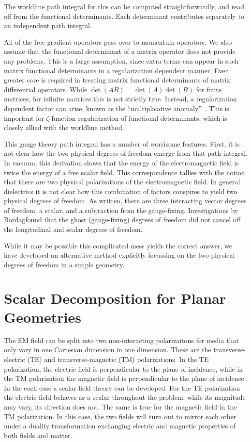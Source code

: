 The worldline path integral for this can be computed straightforwardly, and read off from the functional
determinants.  Each determinant contributes separately to an independent path integral.  

All of the free gradient operators pass over to momentum operators.  We also assume that the 
functional determinant of a matrix operator does not provide any problems.  This is a large assumption,
since extra terms can appear in such matrix functional determinants in a regularization dependent manner.
Even greater care is required in treating matrix functional determinants of matrix differential operators.
While $\det(AB)=\det(A)\det(B)$ for finite matrices, for infinite matrices this is not strictly true. 
Instead, a regularization dependent factor can arise, known as the ``multiplicative anomaly''~\cite{McKenzieSmith1998}.
This is important for $\zeta$-function regularization of functional determinants, which is closely allied with the worldline method.

This gauge theory path integral has a number of worrisome features.
First, it is not clear how the two physical degrees of freedom emerge from that path integral.
In vacuum, this derivation shows that the energy of the electromagnetic field is twice the energy 
of a free scalar field.  This correspondence tallies with the notion that there are two physical 
polarizations of the electromagnetic field. 
In general dielectrics it is not clear how this combination of factors conspires to yield two physical
degrees of freedom.  
As written, there are three interacting vector degrees of freedom, a scalar, and a subtraction from
the gauge-fixing.  Investigations by Bordag\etal found that the ghost (gauge-fixing) degrees of freedom
did not cancel off the longitudinal and scalar degrees of freedom.  

While it may be possible this complicated mess yields the correct answer, we have developed an 
alternative method explicitly focussing on the two physical degrees of freedom in a simple geometry.  

\section{Scalar Decomposition for Planar Geometries}

The EM field can be split into two non-interacting polarizaitons for media that only vary in one Cartesian dimension in one dimension.
These are the transverse-electric (TE) and transverse-magnetic (TM) polarizations.  In the TE polarization,
the electric field is perpendicular to the plane of incidence, while in the TM polarization the magnetic field
is perpendicular to the plane of incidence.
In the each case a scalar field theory can be developed.  For the TE polarization the electric
field behaves as a scalar throughout the problem: while its magnitude may vary, its direction does not.
The same is true for the magnetic field in the TM polarization.  
In this case, the two fields will turn out to mirror each other under a duality transformation exchanging
electric and magnetic properties of both fields and matter.  

